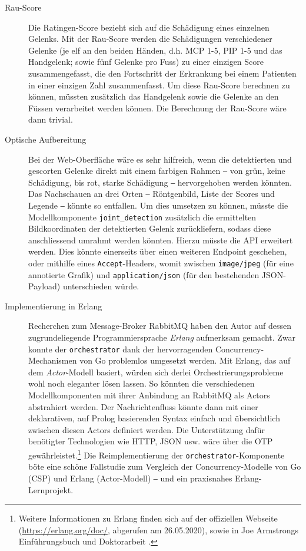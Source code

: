 \begin{description}
    \item [Rau-Score] Die Ratingen-Score bezieht sich auf die Schädigung eines einzelnen Gelenks. Mit der Rau-Score werden die Schädigungen verschiedener Gelenke (je elf an den beiden Händen, d.h. MCP 1-5, PIP 1-5 und das Handgelenk; sowie fünf Gelenke pro Fuss) zu einer einzigen Score zusammengefasst, die den Fortschritt der Erkrankung bei einem Patienten in einer einzigen Zahl zusammenfasst. Um diese Rau-Score berechnen zu können, müssten zusätzlich das Handgelenk sowie die Gelenke an den Füssen verarbeitet werden können. Die Berechnung der Rau-Score wäre dann trivial.
    \item [Optische Aufbereitung] Bei der Web-Oberfläche wäre es sehr hilfreich, wenn die detektierten und gescorten Gelenke direkt mit einem farbigen Rahmen ‒ von grün, keine Schädigung, bis rot, starke Schädigung ‒ hervorgehoben werden könnten. Das Nachschauen an drei Orten ‒ Röntgenbild, Liste der Scores und Legende ‒ könnte so entfallen. Um dies umsetzen zu können, müsste die Modellkomponente \texttt{joint\_detection} zusätzlich die ermittelten Bildkoordinaten der detektierten Gelenk zurückliefern, sodass diese anschliessend umrahmt werden könnten. Hierzu müsste die API erweitert werden. Dies könnte einerseits über einen weiteren Endpoint geschehen, oder mithilfe eines \texttt{Accept}-Headers, womit zwischen \texttt{image/jpeg} (für eine annotierte Grafik) und \texttt{ap\-pli\-ca\-tion/json} (für den bestehenden JSON-Payload) unterschieden würde.
    \item [Implementierung in Erlang] Recherchen zum Message-Broker RabbitMQ haben den Autor auf dessen zugrundeliegende Programmiersprache \textit{Erlang} aufmerksam gemacht. Zwar konnte der \texttt{orchestrator} dank der hervorragenden Concurrency-Me\-cha\-nis\-men von Go problemlos umgesetzt werden. Mit Erlang, das auf dem \textit{Actor}-Modell basiert, würden sich derlei Orchestrierungsprobleme wohl noch eleganter lösen lassen. So könnten die verschiedenen Modellkomponenten mit ihrer Anbindung an RabbitMQ als Actors abstrahiert werden. Der Nachrichtenfluss könnte dann mit einer deklarativen, auf Prolog basierenden Syntax einfach und übersichtlich zwischen diesen Actors definiert werden. Die Unterstützung dafür benötigter Technologien wie HTTP, JSON usw. wäre über die OTP gewährleistet.\footnote{Weitere Informationen zu Erlang finden sich auf der offiziellen Webseite (\url{https://erlang.org/doc/}, abgerufen am 26.05.2020), sowie in Joe Armstrongs Einführungsbuch \cite{programming-erlang} und Doktorarbeit \cite{armstrong2003}.} Die Reimplementierung der \texttt{orchestrator}-Komponente böte eine schöne Fallstudie zum Vergleich der Concurrency-Modelle von Go (CSP) und Erlang (Actor-Modell) ‒ und ein praxisnahes Erlang-Lernprojekt.
\end{description}

